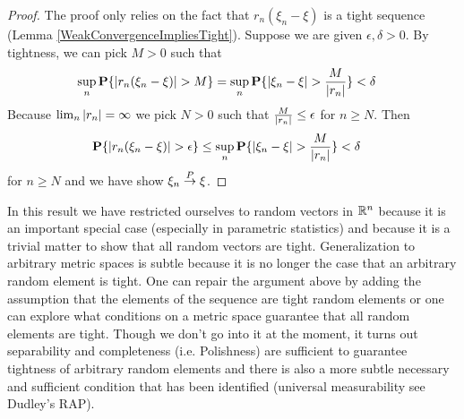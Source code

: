 \begin{proof}
The proof only relies on the fact that $r_n(\xi_n -  \xi)$ is a
tight sequence (Lemma \ref{WeakConvergenceImpliesTight}).  Suppose we
are given $\epsilon, \delta > 0$.  By
tightness, we can pick $M > 0$ such that 
\begin{align*}
\sup_n \textbf{P}\{\left \vert r_n(\xi_n - \xi) \right \vert > M\} &= \sup_n \textbf{P}\{\left \vert \xi_n - \xi \right \vert > \frac{M}{\left \vert r_n \right \vert}\} < \delta
\end{align*}
Because $\lim_n \left \vert r_n \right \vert = \infty$ we pick $N>0$ such that
$\frac{M}{\left \vert r_n \right \vert} \leq \epsilon$ for $n \geq N$.  Then 
\begin{align*}
\textbf{P}\{\left \vert r_n(\xi_n - \xi) \right \vert > \epsilon\} &\leq \sup_n \textbf{P}\{\left \vert \xi_n - \xi \right \vert > \frac{M}{\left \vert r_n \right \vert}\} < \delta
\end{align*}
for $n \geq N$ and we have show $\xi_n \overset{P}\to \xi$.
\end{proof}

In this result we have restricted ourselves to random vectors in
$\mathbb{R}^n$ because it is an important special case (especially in
parametric statistics) and because it is a trivial matter to show that all random
vectors are tight.  Generalization to arbitrary metric spaces is
subtle because it is no longer the case that an arbitrary random
element is tight.  One can repair the argument above by adding the
assumption that the elements of the sequence are tight random elements
or one can explore what conditions on a metric space guarantee that
all random elements are tight.  Though we don't go into it at the
moment, it turns out separability and completeness (i.e. Polishness) 
are sufficient to guarantee tightness of arbitrary random
elements and there is also a more subtle necessary and sufficient
condition that has been identified (universal measurability see
Dudley's RAP).

